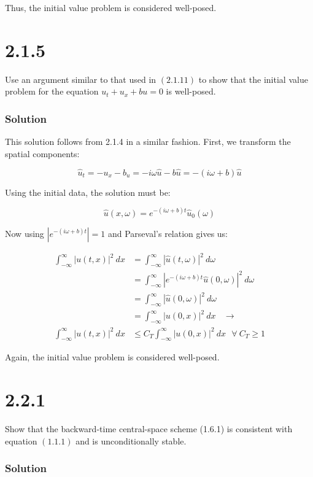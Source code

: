 \documentclass[12pt]{article}
\begin{document}
\noindent Thus, the initial value problem is considered well-posed.

\section*{2.1.5}
Use an argument similar to that used in $(2.1 .11)$ to show that the initial value problem for the equation $u_{t}+u_{x}+b u=0$ is well-posed.

\subsubsection*{Solution}

This solution follows from 2.1.4 in a similar fashion. First, we transform the spatial components:

$$ \hat{u}_t = -u_x-b_u = -i\omega\hat{u} -b \hat{u} = -(i\omega + b)\hat{u}$$

\noindent Using the initial data, the solution must be:

$$ \hat{u}(x,\omega) = e^{-(i\omega + b)t}\hat{u}_0(\omega) $$

\noindent Now using $|e^{-(i\omega + b)t}|=1$ and Parseval's relation gives us:

\begin{equation*}
    \begin{aligned}
    \int_{-\infty}^\infty |u(t,x)|^2~dx & = \int_{-\infty}^\infty |\hat{u}(t,\omega)|^2~d\omega \\
    ~ &= \int_{-\infty}^\infty |e^{-(i\omega + b)t}\hat{u}(0, \omega)|^2~d\omega \\
    ~ &= \int_{-\infty}^\infty |\hat{u}(0, \omega)|^2~d\omega \\
    ~ &= \int_{-\infty}^\infty |u(0, x)|^2~dx ~~~~ \longrightarrow \\
    \int_{-\infty}^\infty |u(t,x)|^2~dx & \leq C_T\int_{-\infty}^\infty |u(0,x)|^2~dx ~~~ \forall ~C_T \geq 1
    \end{aligned}
\end{equation*}

\noindent Again, the initial value problem is considered well-posed.

\section*{2.2.1}
Show that the backward-time central-space scheme (1.6.1) is consistent with equation $(1.1 .1)$ and is unconditionally stable.

\subsubsection*{Solution}
\end{document}
